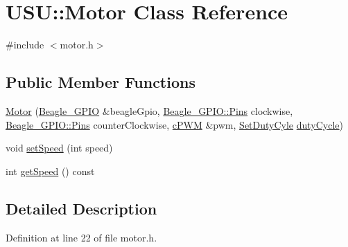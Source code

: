 \hypertarget{class_u_s_u_1_1_motor}{\section{\-U\-S\-U\-:\-:\-Motor \-Class \-Reference}
\label{class_u_s_u_1_1_motor}
}


{\ttfamily \#include $<$motor.\-h$>$}

\subsection*{\-Public \-Member \-Functions}
\begin{DoxyCompactItemize}
\item 
\hyperlink{class_u_s_u_1_1_motor_a2200a3939cd62d2e22e9b134b54bc402}{\-Motor} (\hyperlink{class_beagle___g_p_i_o}{\-Beagle\-\_\-\-G\-P\-I\-O} \&beagle\-Gpio, \hyperlink{class_beagle___g_p_i_o_a9b1fd560ea5d2d65898ac15c23055e58}{\-Beagle\-\_\-\-G\-P\-I\-O\-::\-Pins} clockwise, \hyperlink{class_beagle___g_p_i_o_a9b1fd560ea5d2d65898ac15c23055e58}{\-Beagle\-\_\-\-G\-P\-I\-O\-::\-Pins} counter\-Clockwise, \hyperlink{classc_p_w_m}{c\-P\-W\-M} \&pwm, \hyperlink{motor_8h_aa4a2cd53d0866ae4c273573db3c4870d}{\-Set\-Duty\-Cyle} \hyperlink{motor-example_8cpp_a839337b9ba74aba4916f05f8676a90c0}{duty\-Cycle})
\item 
void \hyperlink{class_u_s_u_1_1_motor_aa58cbc26a0da87389dd208367d0fa407}{set\-Speed} (int speed)
\item 
int \hyperlink{class_u_s_u_1_1_motor_a98d4c98ddc30e00485712f55b4a91211}{get\-Speed} () const 
\end{DoxyCompactItemize}


\subsection{\-Detailed \-Description}


\-Definition at line 22 of file motor.\-h.



